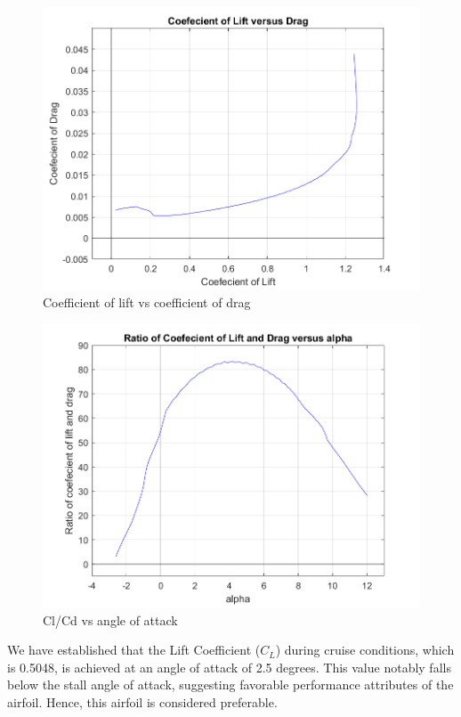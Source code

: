\documentclass[12 pt]{article}
\begin{document}
\begin{figure}[H]
    \centering
    \includegraphics[scale = 0.8]{Codes/Week 6/Cl_Cd.png}
    \caption{Coefficient of lift vs coefficient of drag}
    \label{fig:enter-label}
\end{figure}

\begin{figure}[H]
    \centering
    \includegraphics[scale = 0.8]{Codes/Week 6/Cl_Cd_ratio.png}
    \caption{Cl/Cd vs angle of attack}
    \label{fig:enter-label}
\end{figure}
\newpage

We have established that the Lift Coefficient ($C_L$) during cruise conditions, which is 0.5048, is achieved at an angle of attack of 2.5 degrees. This value notably falls below the stall angle of attack, suggesting favorable performance attributes of the airfoil. Hence, this airfoil is considered preferable.
\end{document}
